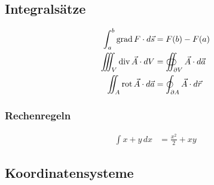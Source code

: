 \subsection{Integralsätze}
\begin{align*}
    \int_{a}^b \operatorname{grad} F \cdot d \vec{s}     & = F(b) - F(a)                                  \\
    \iiint_V \operatorname{div} \vec{A} \cdot dV         & = \oiint_{ \partial V} \vec{A} \cdot d \vec{a} \\
    \iint_{A} \operatorname{rot} \vec{A} \cdot d \vec{a} & = \oint_{ \partial A} \vec{A} \cdot d \vec{r}
\end{align*}

\subsubsection{Rechenregeln}
\begin{align*}
    \int x + y \, dx &= \frac{x^2}{2} + xy
\end{align*}


\subsection{Koordinatensysteme}

